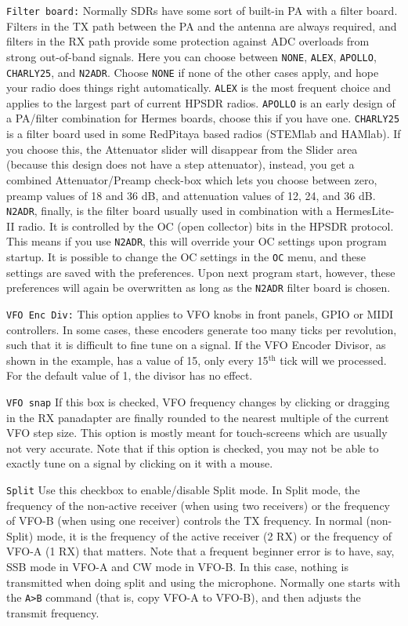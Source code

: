 \documentclass[12pt]{book}
\def\rett#1{\texttt{\color{red}#1}}
\def\bltt#1{\texttt{\color{blue}#1}}
\begin{document}
\rett{Filter board:} Normally SDRs have some sort of built-in PA with a filter board. Filters in the TX path
between the PA and the antenna are always required, and filters in the RX path provide some protection
against ADC overloads from strong out-of-band signals. Here you can choose between \texttt{NONE},
\texttt{ALEX},
\texttt{APOLLO}, \texttt{CHARLY25}, and \texttt{N2ADR}. Choose \texttt{NONE} if none of the other cases
apply, and hope your radio does things right automatically. \texttt{ALEX} is the most frequent choice
and applies to the largest part of current HPSDR radios. \texttt{APOLLO} is an early design of a
PA/filter combination for Hermes boards, choose this if you have one. \texttt{CHARLY25} is a filter board
used in some RedPitaya based radios (STEMlab and HAMlab). If you choose this, the Attenuator slider will
disappear from the Slider area (because this design does not have a step attenuator), instead, you get
a combined Attenuator/Preamp check-box which lets you choose between zero, preamp values of 18 and 36 dB,
and attenuation values of 12, 24, and 36 dB. \texttt{N2ADR}, finally, is the filter board usually used
in combination with a HermesLite-II radio. It is controlled by the OC (open collector) bits in the HPSDR
protocol. This means if you use \texttt{N2ADR}, this will override your OC settings upon program startup.
It is possible to change the OC settings in the \bltt{OC} menu, and these settings are saved with the
preferences. Upon next program start, however, these preferences will again be overwritten as long
as the \texttt{N2ADR} filter board is chosen.

\rett{VFO Enc Div:} This option applies to VFO knobs in front panels, GPIO
or MIDI controllers. In some cases, these encoders generate too many ticks per revolution,
such that it is difficult to fine tune on a signal.
If the VFO Encoder Divisor, as shown in the example, has a value of
15, only every 15$^\textrm{th}$ tick will we processed. For the default value of 1,
the divisor has no effect.

\rett{VFO snap} If this box is checked, VFO frequency changes by clicking or dragging in the
RX panadapter are finally rounded to the nearest multiple of the current VFO step size. This
option is mostly meant for touch-screens which are usually not very accurate. Note that if
this option is checked, you may not be able to exactly tune on a signal by clicking on
it with a mouse.

\rett{Split} Use this checkbox to enable/disable Split mode. In Split mode, the frequency of
the non-active receiver (when using two receivers) or the frequency of VFO-B (when using one
receiver) controls the TX frequency. In normal (non-Split) mode, it is the frequency of
the active receiver (2 RX) or the frequency of VFO-A (1 RX) that matters.
Note that a frequent beginner error is to have, say,
SSB mode in VFO-A and CW mode in VFO-B. In this case, nothing is
transmitted when doing split and using the microphone. Normally one
starts with the \bltt{A>B} command (that is, copy VFO-A to VFO-B), and
then adjusts the transmit frequency.
\end{document}
